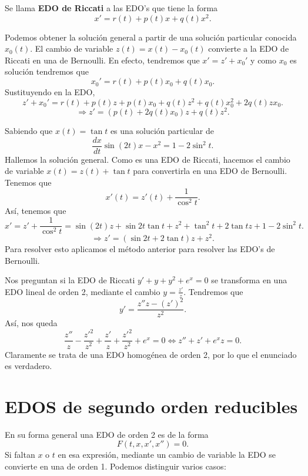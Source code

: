 \begin{definition}
Se llama \textbf{EDO de Riccati} a las EDO's que tiene la forma
\[x' = r\left(t\right)+p\left(t\right)x+q\left(t\right)x^{2} .\]
\end{definition}
\begin{observation}
Podemos obtener la solución general a partir de una solución particular conocida $\displaystyle x_{0}\left(t\right) $. El cambio de variable $\displaystyle z\left(t\right)= x\left(t\right)-x_{0}\left(t\right) $ convierte a la EDO de Riccati en una de Bernoulli. En efecto, tendremos que $\displaystyle x' = z' + x_{0}' $ y como $\displaystyle x_{0} $ es solución tendremos que 
\[x_{0}' = r\left(t\right) + p\left(t\right)x_{0}+q\left(t\right)x_{0} .\]
Sustituyendo en la EDO,
\[z' + x_{0}' = r\left(t\right) + p\left(t\right)z + p\left(t\right)x_{0}+ q\left(t\right)z^{2} + q\left(t\right)x_{0}^{2} +2q\left(t\right)zx_{0} .\]
\[ \Rightarrow z' = \left(p\left(t\right)+2q\left(t\right)x_{0}\right)z + q\left(t\right)z^{2} .\]
\end{observation}
\begin{eg}
Sabiendo que $\displaystyle x\left(t\right)=\tan t $ es una solución particular de
\[\frac{dx}{dt}\sin\left(2t\right)x - x^{2} = 1 - 2\sin ^{2}t .\]
Hallemos la solución general. Como es una EDO de Riccati, hacemos el cambio de variable $\displaystyle x\left(t\right)=z\left(t\right)+ \tan t $ para convertirla en una EDO de Bernoulli. Tenemos que
\[x'\left(t\right)=z'\left(t\right)+\frac{1}{\cos ^{2}t} .\]
Así, tenemos que 
\[x' = z' + \frac{1}{\cos ^{2}t} = \sin\left(2t\right)z + \sin2t \tan t + z^{2} + \tan ^{2}t + 2\tan t z+1-2\sin ^{2}t .\]
\[\Rightarrow z' = \left(\sin 2t + 2\tan t\right)z + z^{2} .\]
Para resolver esto aplicamos el método anterior para resolver las EDO's de Bernoulli. 
\end{eg}
\begin{eg}
Nos preguntan si la EDO de Riccati $\displaystyle y' + y + y^{2} + e^{x} = 0 $ se transforma en una EDO lineal de orden 2, mediante el cambio $\displaystyle y = \frac{z'}{z} $. Tendremos que 
\[y' = \frac{z'' z-\left(z'\right)^{2}}{z^{2}} .\]
Así, nos queda
\[\frac{z''}{z}-\frac{z'^{2}}{z^{2}}+\frac{z'}{z}+\frac{z'^{2}}{z^{2}}+e^{x} =0 \iff z'' + z' + e^{x}z = 0 .\]
Claramente se trata de una EDO homogénea de orden 2, por lo que el enunciado es verdadero. 
\end{eg}
\section{EDOS de segundo orden reducibles}
En su forma general una EDO de orden 2 es de la forma 
\[F\left(t, x, x', x''\right)=0 .\]
Si faltan $\displaystyle x $ o $\displaystyle t $ en esa expresión, mediante un cambio de variable la EDO se convierte en una de orden 1. Podemos distinguir varios casos:

